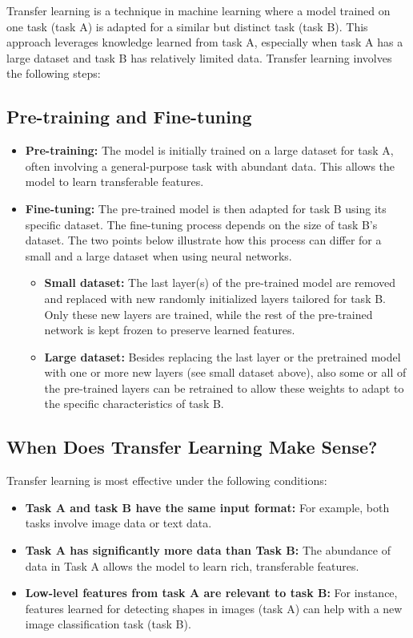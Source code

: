 \documentclass[12pt,openany]{book}
\begin{document}
Transfer learning is a technique in machine learning where a model trained on one task (task A) is adapted for a similar but distinct task (task B). This approach leverages knowledge learned from task A, especially when task A has a large dataset and task B has relatively limited data. Transfer learning involves the following steps:

\subsection{Pre-training and Fine-tuning}

\begin{itemize}
    \item \textbf{Pre-training:} The model is initially trained on a large dataset for task A, often involving a general-purpose task with abundant data. This allows the model to learn transferable features.
    \item \textbf{Fine-tuning:} The pre-trained model is then adapted for task B using its specific dataset. The fine-tuning process depends on the size of task B’s dataset. The two points below illustrate how this process can differ for a small and a large dataset when using neural networks.
    \begin{itemize}
        \item \textbf{Small dataset:} The last layer(s) of the pre-trained model are removed and replaced with new randomly initialized layers tailored for task B. Only these new layers are trained, while the rest of the pre-trained network is kept frozen to preserve learned features.
        \item \textbf{Large dataset:} Besides replacing the last layer or the pretrained model with one or more new layers (see small dataset above), also some or all of the pre-trained layers can be retrained to allow these weights to adapt to the specific characteristics of task B.
    \end{itemize}
\end{itemize}

\subsection{When Does Transfer Learning Make Sense?}

Transfer learning is most effective under the following conditions:
\begin{itemize}
    \item \textbf{Task A and task B have the same input format:} For example, both tasks involve image data or text data.
    \item \textbf{Task A has significantly more data than Task B:} The abundance of data in Task A allows the model to learn rich, transferable features.
    \item \textbf{Low-level features from task A are relevant to task B:} For instance, features learned for detecting shapes in images (task A) can help with a new image classification task (task B).
\end{itemize}
\end{document}
